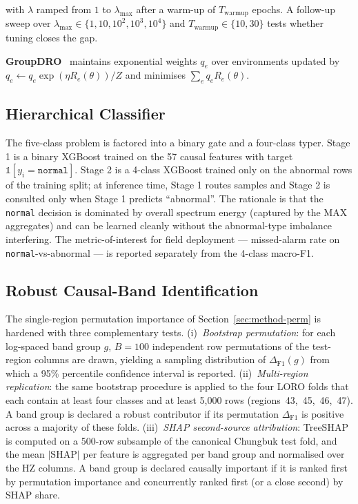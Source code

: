 \documentclass[sensors,article,submit,pdftex,oneauthor]{Definitions/mdpi}
\begin{document}
with $\lambda$ ramped from $1$ to $\lambda_{\max}$ after a
warm-up of $T_\mathrm{warmup}$ epochs. A follow-up sweep over
$\lambda_{\max} \in \{1, 10, 10^2, 10^3, 10^4\}$ and
$T_\mathrm{warmup} \in \{10, 30\}$ tests whether tuning closes
the gap.

\textbf{GroupDRO}~\cite{sagawa2020groupdro} maintains
exponential weights $q_e$ over environments updated by
$q_e \leftarrow q_e \exp(\eta R_e(\theta)) / Z$ and minimises
$\sum_e q_e R_e(\theta)$.

\subsection{Hierarchical Classifier}\label{sec:method-hier}

The five-class problem is factored into a binary gate and a
four-class typer. Stage 1 is a binary XGBoost trained on the
57 causal features with target
$\mathbb{1}[y_i = \texttt{normal}]$. Stage 2 is a 4-class
XGBoost trained only on the abnormal rows of the training
split; at inference time, Stage 1 routes samples and Stage 2 is
consulted only when Stage 1 predicts ``abnormal''. The
rationale is that the \texttt{normal} decision is dominated by
overall spectrum energy (captured by the MAX aggregates) and
can be learned cleanly without the abnormal-type imbalance
interfering. The metric-of-interest for field deployment ---
missed-alarm rate on \texttt{normal}-vs-abnormal --- is
reported separately from the 4-class macro-F1.

\subsection{Robust Causal-Band Identification}\label{sec:method-robust}

The single-region permutation importance of
Section~\ref{sec:method-perm} is hardened with three
complementary tests. (i)~\emph{Bootstrap permutation}: for each
log-spaced band group $g$, $B = 100$ independent row
permutations of the test-region columns are drawn, yielding a
sampling distribution of $\Delta_{\mathrm{F1}}(g)$ from which a
95\% percentile confidence interval is reported.
(ii)~\emph{Multi-region replication}: the same bootstrap
procedure is applied to the four LORO folds that each contain
at least four classes and at least 5{,}000 rows
(regions~43,~45,~46,~47). A band group is declared a robust
contributor if its permutation $\Delta_{\mathrm{F1}}$ is
positive across a majority of these folds.
(iii)~\emph{SHAP second-source attribution}: TreeSHAP
\cite{lundberg2017shap} is computed on a 500-row subsample of
the canonical Chungbuk test fold, and the mean $\lvert \text{SHAP}
\rvert$ per feature is aggregated per band group and normalised
over the HZ columns. A band group is declared causally important
if it is ranked first by permutation importance and concurrently
ranked first (or a close second) by SHAP share.
\end{document}
